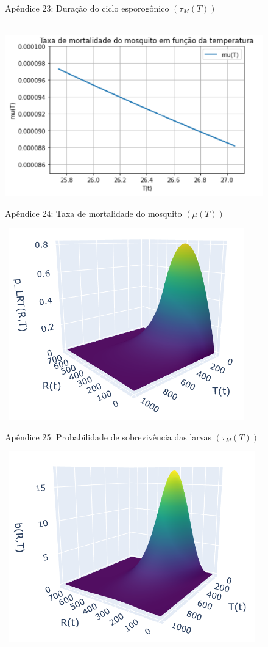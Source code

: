 \documentclass[
	12pt,				%
	oneside,			%
	a4paper,			%
	english,			%
	brazil				%
	]{abntex2}
\begin{document}
\begin{apendicesenv}
\begin{figure}[!ht]
	\caption*{Apêndice 23: Duração do ciclo esporogônico $(\tau_{M}(T))$} 
\end{figure} 
\begin{figure}[!ht]
	\centering
	\hbox{\hspace{1.0em} \includegraphics[scale=1.0] {Plot_mu(T).png}}
	\caption*{Apêndice 24: Taxa de mortalidade do mosquito $(\mu(T))$} 
\end{figure} 
\newpage
\begin{figure}[!ht]
	\centering
	\hbox{\hspace{3.5em} \includegraphics[scale=1.0] {Plot_p_LRT(R,T)_c1_c2_corrigido.png}}
	\caption*{Apêndice 25: Probabilidade de sobrevivência das larvas $(\tau_{M}(T))$} 
\end{figure} 
\begin{figure}[!ht]
	\centering
	\hbox{\hspace{3.5em} \includegraphics[scale=1.0] {Plot_b(R,T)_c1_c2_corrigido.png}}

\end{figure}
\end{apendicesenv}
\end{document}
